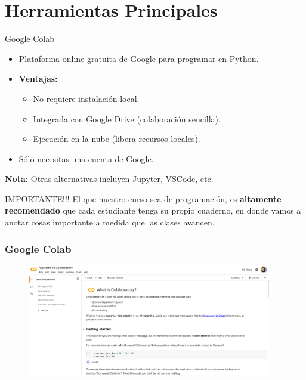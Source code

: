 \documentclass[10pt]{beamer}
\begin{document}
\section{Herramientas Principales}

\begin{frame}{Google Colab}
  \begin{itemize}
    \item Plataforma online gratuita de Google para programar en Python.
    \item \textbf{Ventajas:}
      \begin{itemize}
        \item No requiere instalación local.
        \item Integrada con Google Drive (colaboración sencilla).
        \item Ejecución en la nube (libera recursos locales).
      \end{itemize}
    \item Sólo necesitas una cuenta de Google.
  \end{itemize}
  \vspace{0.3cm}
  \textbf{Nota:} Otras alternativas incluyen Jupyter, VSCode, etc.

  \begin{block}{IMPORTANTE!!!}
    El que nuestro curso sea de programación, es \textbf{altamente recomendado} que cada estudiante tenga su propio cuaderno, en donde vamos a anotar cosas importante a medida que las clases avancen.
  \end{block}
\end{frame}

\begin{frame}
  \frametitle{Google Colab}
  \begin{figure}
    \includegraphics[width=0.95\textwidth]{GColab01.png}
  \end{figure}
\end{frame}
\end{document}
